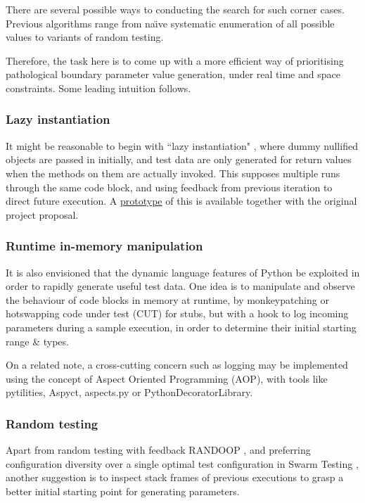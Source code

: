 \documentclass{icldt}
\numberwithin{equation}{section}       %
\def\naive{na\"{\i}ve }
\begin{document}
There are several possible ways to conducting the search for such corner cases. Previous algorithms range from \naive systematic enumeration of all possible values to variants of random testing.

Therefore, the task here is to come up with a more efficient way of prioritising pathological boundary parameter value generation, under real time and space constraints. Some leading intuition follows.
\subsubsection{Lazy instantiation}
	It might be reasonable to begin with ``lazy instantiation" \cite{Allwood2011}, where dummy nullified objects are passed in initially, and test data are only generated for return values when the methods on them are actually invoked. This supposes multiple runs through the same code block, and using feedback from previous iteration to direct future execution. A \href{https://github.com/evandrix/Pyrulan}{prototype} of this is available together with the original project proposal.

\subsubsection{Runtime in-memory manipulation}
It is also envisioned that the dynamic language features of Python be exploited in order to rapidly generate useful test data. One idea is to manipulate and observe the behaviour of code blocks in memory at runtime, by monkeypatching or hotswapping code under test (CUT) for stubs, but with a hook to log incoming parameters during a sample execution, in order to determine their initial starting range \& types.

On a related note, a cross-cutting concern such as logging may be implemented using the concept of Aspect Oriented Programming (AOP), with tools like pytilities, Aspyct, aspects.py or PythonDecoratorLibrary.

\subsubsection{Random testing}
Apart from random testing with feedback RANDOOP \cite{Pacheco2007}, and preferring configuration diversity over a single optimal test configuration in Swarm Testing \cite{AlexGroceSep2011}, another suggestion is to inspect stack frames of previous executions to grasp a better initial starting point for generating parameters.
\end{document}
